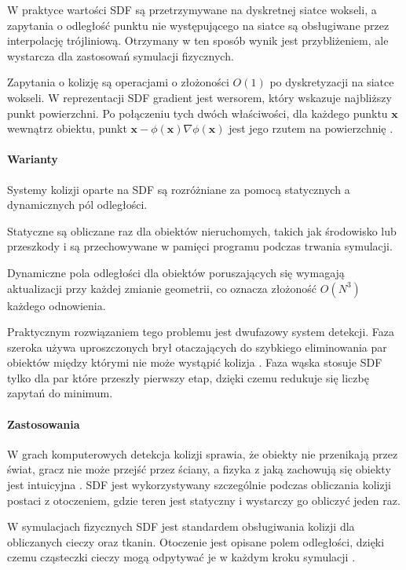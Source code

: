 W praktyce wartości SDF są przetrzymywane na dyskretnej siatce wokseli, a zapytania o odległość punktu nie występującego na siatce są obsługiwane przez interpolację trójliniową. Otrzymany w ten sposób wynik jest przybliżeniem, ale wystarcza dla zastosowań symulacji fizycznych.

Zapytania o kolizję są operacjami o złożoności $O(1)$ po dyskretyzacji na siatce wokseli. W reprezentacji SDF gradient jest wersorem, który wskazuje najbliższy punkt powierzchni. Po połączeniu tych dwóch właściwości, dla każdego punktu $\mathbf{x}$ wewnątrz obiektu, punkt $\mathbf{x} - \phi(\mathbf{x})\nabla\phi(\mathbf{x})$ jest jego rzutem na powierzchnię \cite{ericson2004}.


\paragraph{Warianty}
Systemy kolizji oparte na SDF są rozróżniane za pomocą statycznych a dynamicznych pól odległości. 

Statyczne są obliczane raz dla obiektów nieruchomych, takich jak środowisko lub przeszkody i są przechowywane w pamięci programu podczas trwania symulacji. 

Dynamiczne pola odległości dla obiektów poruszających się wymagają aktualizacji przy każdej zmianie geometrii, co oznacza złożoność $O(N^3)$ każdego odnowienia.

Praktycznym rozwiązaniem tego problemu jest dwufazowy system detekcji. Faza szeroka używa uproszczonych brył otaczających do szybkiego eliminowania par obiektów między którymi nie może wystąpić kolizja \cite{ericson2004}. Faza wąska stosuje SDF tylko dla par które przeszły pierwszy etap, dzięki czemu redukuje się liczbę zapytań do minimum.

\paragraph{Zastosowania}
W grach komputerowych detekcja kolizji sprawia, że obiekty nie przenikają przez świat, gracz nie może przejść przez ściany, a fizyka z jaką zachowują się obiekty jest intuicyjna \cite{ericson2004}. SDF jest wykorzystywany szczególnie podczas obliczania kolizji postaci z otoczeniem, gdzie teren jest statyczny i wystarczy go obliczyć jeden raz.

W symulacjach fizycznych SDF jest standardem obsługiwania kolizji dla obliczanych cieczy oraz tkanin. Otoczenie jest opisane polem odległości, dzięki czemu cząsteczki cieczy mogą odpytywać je w każdym kroku symulacji \cite{bridson2008}.

